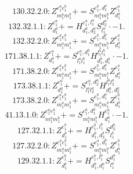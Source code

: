 \documentclass[letterpaper,10pt,fleqn,leqno,onecolumn]{article}
\begin{document}
\begin{equation} \;\;\;\;\;\;  130.32.2.0: Z^{e_{1}^{a}e_{1}^{b}}_{m_{1}^{a}m_{1}^{b}}+=S^{e_{1}^{b},d_{1}^{a}}_{m_{1}^{a}m_{1}^{b}}Z^{e_{1}^{a}}_{d_{1}^{a}} \end{equation}
\begin{equation} \;\;\;\;\;\;  132.32.1.1: Z^{e_{1}^{a}}_{d_{1}^{a}}+=H^{e_{1}^{a},l_{1}^{a}}_{d_{1}^{a},d_{2}^{a}}S^{d_{2}^{a}}_{l_{1}^{a}}\cdot -1. \end{equation}
\begin{equation} \;\;\;\;\;\;  132.32.2.0: Z^{e_{1}^{a}e_{1}^{b}}_{m_{1}^{a}m_{1}^{b}}+=S^{e_{1}^{b},d_{1}^{a}}_{m_{1}^{a}m_{1}^{b}}Z^{e_{1}^{a}}_{d_{1}^{a}} \end{equation}
\begin{equation} \;\;\;\;\;\;  171.38.1.1: Z^{e_{1}^{a}}_{d_{1}^{a}}+=S^{e_{1}^{a},d_{1}^{b}}_{l_{1}^{a}l_{1}^{b}}H^{l_{1}^{a}l_{1}^{b}}_{d_{1}^{b},d_{1}^{a}}\cdot -1. \end{equation}
\begin{equation} \;\;\;\;\;\;  171.38.2.0: Z^{e_{1}^{a}e_{1}^{b}}_{m_{1}^{a}m_{1}^{b}}+=S^{e_{1}^{b},d_{1}^{a}}_{m_{1}^{a}m_{1}^{b}}Z^{e_{1}^{a}}_{d_{1}^{a}} \end{equation}
\begin{equation} \;\;\;\;\;\;  173.38.1.1: Z^{e_{1}^{a}}_{d_{1}^{a}}+=S^{e_{1}^{a},d_{2}^{a}}_{l_{1}^{a}l_{2}^{a}}H^{l_{1}^{a}l_{2}^{a}}_{d_{1}^{a},d_{2}^{a}} \end{equation}
\begin{equation} \;\;\;\;\;\;  173.38.2.0: Z^{e_{1}^{a}e_{1}^{b}}_{m_{1}^{a}m_{1}^{b}}+=S^{e_{1}^{b},d_{1}^{a}}_{m_{1}^{a}m_{1}^{b}}Z^{e_{1}^{a}}_{d_{1}^{a}} \end{equation}
\begin{equation} \;\;\;\;\;\;  41.13.1.0: Z^{e_{1}^{a}e_{1}^{b}}_{m_{1}^{a}m_{1}^{b}}+=S^{e_{1}^{b},d_{1}^{a}}_{m_{1}^{a}m_{1}^{b}}H^{e_{1}^{a}}_{d_{1}^{a}}\cdot -1. \end{equation}
\begin{equation} \;\;\;\;\;\;  127.32.1.1: Z^{e_{1}^{b}}_{d_{1}^{b}}+=H^{e_{1}^{b},l_{1}^{b}}_{d_{1}^{b},d_{2}^{b}}S^{d_{2}^{b}}_{l_{1}^{b}} \end{equation}
\begin{equation} \;\;\;\;\;\;  127.32.2.0: Z^{e_{1}^{a}e_{1}^{b}}_{m_{1}^{a}m_{1}^{b}}+=S^{e_{1}^{a},d_{1}^{b}}_{m_{1}^{a}m_{1}^{b}}Z^{e_{1}^{b}}_{d_{1}^{b}} \end{equation}
\begin{equation} \;\;\;\;\;\;  129.32.1.1: Z^{e_{1}^{b}}_{d_{1}^{b}}+=H^{e_{1}^{b},l_{1}^{a}}_{d_{1}^{b},d_{1}^{a}}S^{d_{1}^{a}}_{l_{1}^{a}} \end{equation}
\end{document}
